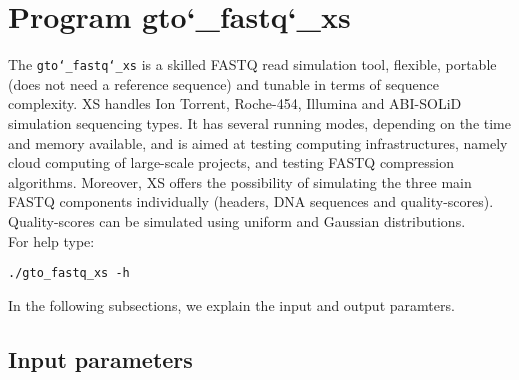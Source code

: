 \section{Program gto\char`_fastq\char`_xs}
The \texttt{gto\char`_fastq\char`_xs} is a skilled FASTQ read simulation tool, flexible, portable (does not need a reference sequence) and tunable in terms of sequence complexity. XS handles Ion Torrent, Roche-454, Illumina and ABI-SOLiD simulation sequencing types. It has several running modes, depending on the time and memory available, and is aimed at testing computing infrastructures, namely cloud computing of large-scale projects, and testing FASTQ compression algorithms. Moreover, XS offers the possibility of simulating the three main FASTQ components individually (headers, DNA sequences and quality-scores). Quality-scores can be simulated using uniform and Gaussian distributions.\\
For help type:
\begin{lstlisting}
./gto_fastq_xs -h
\end{lstlisting}
In the following subsections, we explain the input and output paramters.

\subsection*{Input parameters}

